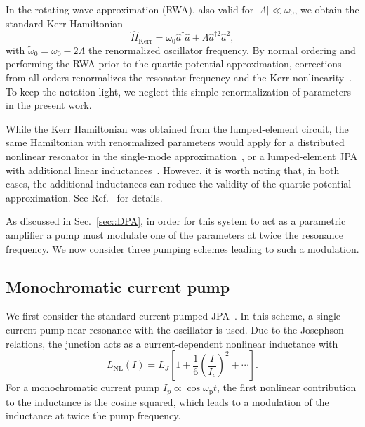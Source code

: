 \documentclass[pra,twocolumn,superscriptaddress]{revtex4-1}
\newcommand{\ah}[0]{\hat{a}}
\newcommand{\wpump}[0]{\omega_{\mathrm{p}}}
\newcommand{\parS}[1]{\left[#1\right]}
\newcommand{\parO}[1]{\left(#1\right)}
\newcommand{\abs}[1]{\left|#1\right|}
\begin{document}
In the rotating-wave approximation (RWA), also valid for $\abs{\Lambda} \ll \omega_0 $, we obtain the standard Kerr Hamiltonian 
\begin{equation}
	\hat{H}_{\mathrm{Kerr}} = 
	\tilde{\omega}_0 \ah^\dag \ah
	 + \Lambda \ah^{\dag 2} \ah^2, \label{eq:hKerr_afterRWA}
\end{equation}
with $\tilde{\omega}_0 = \omega_0 - 2\Lambda$ the renormalized oscillator frequency. By normal ordering and performing the RWA prior to the quartic potential approximation, corrections from all orders  renormalizes the resonator frequency and the Kerr nonlinearity~\cite{Leib:2012kx}. To keep the notation light, we neglect this simple renormalization of parameters in the present work.

While the Kerr Hamiltonian was obtained from the lumped-element circuit, the same Hamiltonian with renormalized parameters would apply for a distributed nonlinear resonator in the single-mode approximation~\cite{Bourassa:2012fk,Eichler:2013fk}, or a lumped-element JPA with additional linear inductances~\cite{Zhou:2014fk}. However, it is worth noting that, in both cases, the additional inductances can reduce the validity of the quartic potential approximation. See Ref.~\cite{Eichler:2013fk} for details.

As discussed in Sec.~\ref{sec::DPA}, in order for this system to act as a parametric amplifier a pump must modulate one of the parameters at twice the resonance frequency. We now consider three pumping schemes leading to such a modulation.

\subsection{Monochromatic current pump} \label{subsec::singlePump}

We first consider the standard current-pumped JPA~\cite{Yurke:1988kb,Yurke:1989fk,Yurke:1989kx,Castellanos-Beltran:2007ys,Hatridge:2011qf,Yurke:2006fk,Eichler:2013fk}. In this scheme, a single current pump near resonance with the oscillator is used. Due to the Josephson relations, the junction acts as a current-dependent nonlinear inductance with~\cite{Manucharyan:2007fk}
\begin{equation}
	\label{eq::nonlinearInductance}
	L_{\mathrm{NL}}(I) = L_J
	\parS{
		1 + 
		\frac{1}{6}
		\parO{
			\frac{I}{I_c}
		}^2 
		+ \cdots
	} .
\end{equation}
For a monochromatic current pump $I_p \propto \cos \wpump t$, the first nonlinear contribution to the inductance is the cosine squared, which leads to a modulation of the inductance at twice the pump frequency. 
\end{document}
